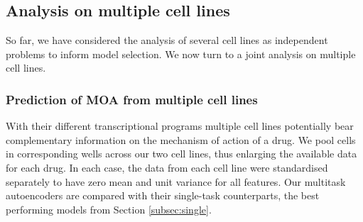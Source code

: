 \subsection{Analysis on multiple cell lines}
\label{subsec:multicellline}

So far, we have considered the analysis of several cell lines as independent problems to inform model selection. We now turn to a joint analysis on multiple cell lines.

\subsubsection{Prediction of MOA from multiple cell lines}
\label{subsubsec:predictionmulticellline}

With their different transcriptional programs multiple cell lines potentially bear complementary information on the mechanism of action of a drug. We pool cells in corresponding wells across our two cell lines, thus enlarging the available data for each drug. In each case, the data from each cell line were standardised separately to have zero mean and unit variance for all features. Our multitask autoencoders are compared with their single-task counterparts, the best performing models from Section \ref{subsec:single}.




